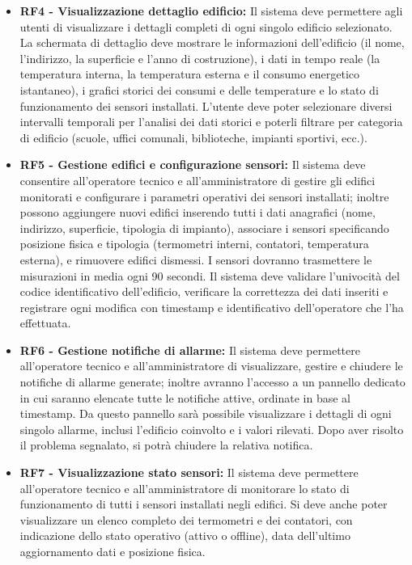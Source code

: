 \begin{itemize}
    \item \textbf{RF4 - Visualizzazione dettaglio edificio:} Il sistema deve permettere agli utenti di visualizzare i dettagli completi di ogni singolo edificio selezionato. La schermata di dettaglio deve mostrare le informazioni dell'edificio (il nome, l'indirizzo, la superficie e l'anno di costruzione), i dati in tempo reale (la temperatura interna, la temperatura esterna e il consumo energetico istantaneo), i grafici storici dei consumi e delle temperature e lo stato di funzionamento dei sensori installati. L'utente deve poter selezionare diversi intervalli temporali per l'analisi dei dati storici e poterli filtrare per categoria di edificio (scuole, uffici comunali, biblioteche, impianti sportivi, ecc.).

    \item \textbf{RF5 - Gestione edifici e configurazione sensori:} Il sistema deve consentire all'operatore tecnico e all’amministratore di gestire gli edifici monitorati e configurare i parametri operativi dei sensori installati; inoltre possono aggiungere nuovi edifici inserendo tutti i dati anagrafici (nome, indirizzo, superficie, tipologia di impianto), associare i sensori specificando posizione fisica e tipologia (termometri interni, contatori, temperatura esterna), e rimuovere edifici dismessi. I sensori dovranno trasmettere le misurazioni in media ogni 90 secondi. Il sistema deve validare l'univocità del codice identificativo dell'edificio, verificare la correttezza dei dati inseriti e registrare ogni modifica con timestamp e identificativo dell'operatore che l'ha effettuata.

    \item \textbf{RF6 - Gestione notifiche di allarme:} Il sistema deve permettere all'operatore tecnico e all’amministratore di visualizzare, gestire e chiudere le notifiche di allarme generate; inoltre avranno l’accesso a un pannello dedicato in cui saranno elencate tutte le notifiche attive, ordinate in base al timestamp. Da questo pannello sarà possibile visualizzare i dettagli di ogni singolo allarme, inclusi l’edificio coinvolto e i valori rilevati. Dopo aver risolto il problema segnalato, si potrà chiudere la relativa notifica.

    \item \textbf{RF7 - Visualizzazione stato sensori:} Il sistema deve permettere all'operatore tecnico e all’amministratore di monitorare lo stato di funzionamento di tutti i sensori installati negli edifici. Si deve anche poter visualizzare un elenco completo dei termometri e dei contatori, con indicazione dello stato operativo (attivo o offline), data dell'ultimo aggiornamento dati e posizione fisica.


\end{itemize}
